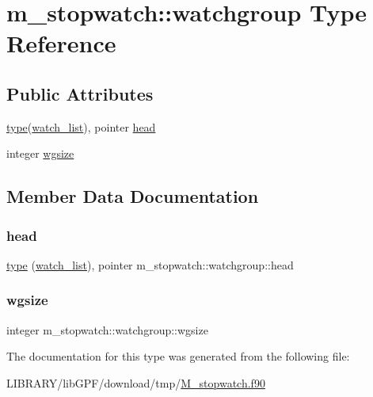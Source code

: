\hypertarget{structm__stopwatch_1_1watchgroup}{}\section{m\+\_\+stopwatch\+:\+:watchgroup Type Reference}
\label{structm__stopwatch_1_1watchgroup}
\subsection*{Public Attributes}
\begin{DoxyCompactItemize}
\item 
\hyperlink{stop__watch_83_8txt_a70f0ead91c32e25323c03265aa302c1c}{type}(\hyperlink{structm__stopwatch_1_1watch__list}{watch\+\_\+list}), pointer \hyperlink{structm__stopwatch_1_1watchgroup_adf624a85ac607be3ec647d44ddb8fd1e}{head}
\item 
integer \hyperlink{structm__stopwatch_1_1watchgroup_a3ecaf14bd4981f9793c7e6b524632c16}{wgsize}
\end{DoxyCompactItemize}


\subsection{Member Data Documentation}
\mbox{\label{structm__stopwatch_1_1watchgroup_adf624a85ac607be3ec647d44ddb8fd1e}} 
\subsubsection{\texorpdfstring{head}{head}}
{\footnotesize\ttfamily \hyperlink{stop__watch_83_8txt_a70f0ead91c32e25323c03265aa302c1c}{type} (\hyperlink{structm__stopwatch_1_1watch__list}{watch\+\_\+list}), pointer m\+\_\+stopwatch\+::watchgroup\+::head}

\mbox{\label{structm__stopwatch_1_1watchgroup_a3ecaf14bd4981f9793c7e6b524632c16}} 
\subsubsection{\texorpdfstring{wgsize}{wgsize}}
{\footnotesize\ttfamily integer m\+\_\+stopwatch\+::watchgroup\+::wgsize}



The documentation for this type was generated from the following file\+:\begin{DoxyCompactItemize}
\item 
L\+I\+B\+R\+A\+R\+Y/lib\+G\+P\+F/download/tmp/\hyperlink{M__stopwatch_8f90}{M\+\_\+stopwatch.\+f90}\end{DoxyCompactItemize}

